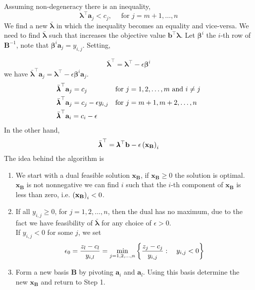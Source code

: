Assuming non-degeneracy there is an inequality,
\begin{equation}
	\pmb{\lambda}^\top\mathbf{a}_j<c_j, \quad \text{ for } j=m+1,\dots, n
\end{equation}
We find a new $\bar{\pmb{\lambda}}$ in which the inequality becomes an equality and vice-versa. We need to find $\bar{\pmb{\lambda}}$ such that increases the objective value $\mathbf{b}^\top\pmb{\lambda}$.
Let $\pmb{\beta}^{i}$ the $i$-th row of $\mathbf{B}^{-1}$, note that $\pmb{\beta}^{i}\mathbf{a}_j=y_{i,j}$. Setting,

 \begin{equation}
 	\bar{\pmb{\lambda}}^\top=\pmb{\lambda}^\top -\epsilon\pmb{\beta}^i 
 \end{equation}
 we have  $\bar{\pmb{\lambda}}^\top\mathbf{a}_j=\pmb{\lambda}^\top -\epsilon\pmb{\beta}^i\mathbf{a}_j$. 
 \begin{align}
		&\bar{\pmb{\lambda}}^\top \mathbf{a}_j=c_j & &\text{for } j=1,2,\dots, m\ \mathrm{and}\ i\neq j\\
 	&\bar{\pmb{\lambda}}^\top \mathbf{a}_j=c_j-\epsilon y_{i, j}& &\text{for } j=m+1,m+2,\dots, n \\
 	&\bar{\pmb{\lambda}}^\top\mathbf{a}_i=c_i-\epsilon 
 \end{align}
 In the other hand,
 \begin{equation}
 	\bar{\pmb{\lambda}}^\top=\pmb{\lambda}^\top \mathbf{b}-\epsilon\left(  \mathbf{x}_{\mathbf{B}} \right)_i
 \end{equation}
 The idea behind the algorithm is 
\begin{enumerate}
	\item We start with a dual feasible solution $\mathbf{x}_{\mathbf{B}}$, if $\mathbf{x}_{\mathbf{B}}\geq 0$ the solution is optimal. $\mathbf{x}_{\mathbf{B}}$ is not nonnegative we can find $i$ such that the $i$-th component of $\mathbf{x}_{\mathbf{B}}$ is less than zero, i.e. $\left(  \mathbf{x}_{\mathbf{B}} \right)_i<0$.
	\item If all $y_{i,j}\geq 0$, for $j=1,2,\dots,n$, then the dual has no maximum, due to the fact we have feasibility of $\bar{\pmb\lambda}$ for any choice of $\epsilon>0$. 
	\\
	If $y_{i,j}<0$ for some $j$, we set
	\begin{equation*}
		\epsilon_0=\frac{z_l-c_l}{y_{i,l}}=\min_{j=1,2,\dots,n}\left\lbrace \frac{z_j-c_j}{y_{i,j}}:\quad y_{i,j}<0 \right\rbrace
	\end{equation*}
	\item Form a new basis $\mathbf{B}$ by pivoting $\mathbf{a}_i$ and $\mathbf{a}_l$. Using this basis determine the new $\mathbf{x}_{\mathbf{B}}$ and return to Step 1.
\end{enumerate}
